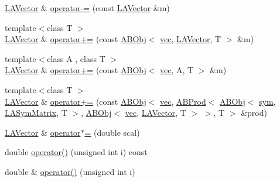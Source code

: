 \begin{DoxyCompactItemize}
\item 
\mbox{\hyperlink{classROOT_1_1Minuit2_1_1LAVector}{L\+A\+Vector}} \& \mbox{\hyperlink{classROOT_1_1Minuit2_1_1LAVector_a57ea12490bd6f7458d26ec9d8f6bf637}{operator-\/=}} (const \mbox{\hyperlink{classROOT_1_1Minuit2_1_1LAVector}{L\+A\+Vector}} \&m)
\item 
{\footnotesize template$<$class T $>$ }\\\mbox{\hyperlink{classROOT_1_1Minuit2_1_1LAVector}{L\+A\+Vector}} \& \mbox{\hyperlink{classROOT_1_1Minuit2_1_1LAVector_ad523e959bda71be5aeaa30c62d2f36b5}{operator+=}} (const \mbox{\hyperlink{classROOT_1_1Minuit2_1_1ABObj}{A\+B\+Obj}}$<$ \mbox{\hyperlink{classROOT_1_1Minuit2_1_1vec}{vec}}, \mbox{\hyperlink{classROOT_1_1Minuit2_1_1LAVector}{L\+A\+Vector}}, T $>$ \&m)
\item 
{\footnotesize template$<$class A , class T $>$ }\\\mbox{\hyperlink{classROOT_1_1Minuit2_1_1LAVector}{L\+A\+Vector}} \& \mbox{\hyperlink{classROOT_1_1Minuit2_1_1LAVector_a7eddea574383be628c265e8acb7b1a1f}{operator+=}} (const \mbox{\hyperlink{classROOT_1_1Minuit2_1_1ABObj}{A\+B\+Obj}}$<$ \mbox{\hyperlink{classROOT_1_1Minuit2_1_1vec}{vec}}, A, T $>$ \&m)
\item 
{\footnotesize template$<$class T $>$ }\\\mbox{\hyperlink{classROOT_1_1Minuit2_1_1LAVector}{L\+A\+Vector}} \& \mbox{\hyperlink{classROOT_1_1Minuit2_1_1LAVector_a4372064902da0f6b7028c1da17612825}{operator+=}} (const \mbox{\hyperlink{classROOT_1_1Minuit2_1_1ABObj}{A\+B\+Obj}}$<$ \mbox{\hyperlink{classROOT_1_1Minuit2_1_1vec}{vec}}, \mbox{\hyperlink{classROOT_1_1Minuit2_1_1ABProd}{A\+B\+Prod}}$<$ \mbox{\hyperlink{classROOT_1_1Minuit2_1_1ABObj}{A\+B\+Obj}}$<$ \mbox{\hyperlink{classROOT_1_1Minuit2_1_1sym}{sym}}, \mbox{\hyperlink{classROOT_1_1Minuit2_1_1LASymMatrix}{L\+A\+Sym\+Matrix}}, T $>$, \mbox{\hyperlink{classROOT_1_1Minuit2_1_1ABObj}{A\+B\+Obj}}$<$ \mbox{\hyperlink{classROOT_1_1Minuit2_1_1vec}{vec}}, \mbox{\hyperlink{classROOT_1_1Minuit2_1_1LAVector}{L\+A\+Vector}}, T $>$ $>$, T $>$ \&prod)
\item 
\mbox{\hyperlink{classROOT_1_1Minuit2_1_1LAVector}{L\+A\+Vector}} \& \mbox{\hyperlink{classROOT_1_1Minuit2_1_1LAVector_a3acb9399e2b908c080e83ccd878eb349}{operator$\ast$=}} (double scal)
\item 
double \mbox{\hyperlink{classROOT_1_1Minuit2_1_1LAVector_a43aede330756d42086d61113434c6cc4}{operator()}} (unsigned int i) const
\item 
double \& \mbox{\hyperlink{classROOT_1_1Minuit2_1_1LAVector_a6515586a06893e5369a4ada7b62e6376}{operator()}} (unsigned int i)

\end{DoxyCompactItemize}
